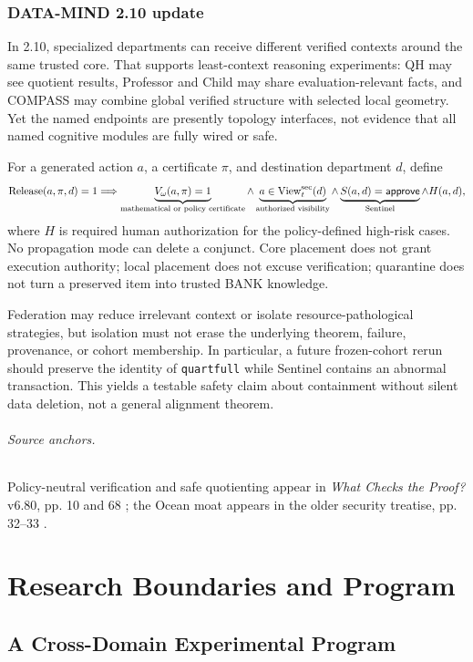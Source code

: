 \documentclass[11pt,oneside]{book}
\theoremstyle{definition}
\theoremstyle{remark}
\newcommand{\View}{\operatorname{View}}
\begin{document}
\section{DATA-MIND 2.10 update}
In 2.10, specialized departments can receive different verified contexts around the same trusted
core. That supports least-context reasoning experiments: QH may see quotient results, Professor and
Child may share evaluation-relevant facts, and COMPASS may combine global verified structure with
selected local geometry. Yet the named endpoints are presently topology interfaces, not evidence that
all named cognitive modules are fully wired or safe.

For a generated action \(a\), a certificate \(\pi\), and destination department \(d\), define
\[
\operatorname{Release}(a,\pi,d)=1
\Longrightarrow
\underbrace{V_\omega(a,\pi)=1}_{\text{mathematical or policy certificate}}
\land
\underbrace{a\in\View_t^{\rm sec}(d)}_{\text{authorized visibility}}
\land
\underbrace{S(a,d)=\mathsf{approve}}_{\text{Sentinel}}
\land H(a,d),
\]
where \(H\) is required human authorization for the policy-defined high-risk cases. No propagation
mode can delete a conjunct. Core placement does not grant execution authority; local placement does
not excuse verification; quarantine does not turn a preserved item into trusted BANK knowledge.

Federation may reduce irrelevant context or isolate resource-pathological strategies, but isolation
must not erase the underlying theorem, failure, provenance, or cohort membership. In particular, a
future frozen-cohort rerun should preserve the identity of \texttt{quartfull} while Sentinel contains
an abnormal transaction. This yields a testable safety claim about containment without silent data
deletion, not a general alignment theorem.

\paragraph{Source anchors.} Policy-neutral verification and safe quotienting appear in
\emph{What Checks the Proof?} v6.80, pp. 10 and 68 \cite{TennesonChecks}; the Ocean moat appears
in the older security treatise, pp. 32--33 \cite{TennesonSecurity}.

\part{Research Boundaries and Program}

\chapter{A Cross-Domain Experimental Program}
\end{document}
